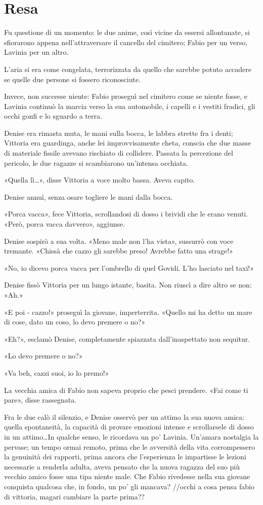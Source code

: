 \chapter{Resa}

Fu questione di un momento: le due anime, così vicine da essersi allontanate, si sfiorarono appena nell'attraversare il cancello del cimitero; Fabio per un verso, Lavinia per un altro. 

L'aria si era come congelata, terrorizzata da quello che sarebbe potuto accadere se quelle due persone si fossero riconosciute. 

Invece, non successe niente: Fabio proseguì nel cimitero come se niente fosse, e Lavinia continuò la marcia verso la sua automobile, i capelli e i vestiti fradici, gli occhi gonfi e lo sguardo a terra.

Denise era rimasta muta, le mani sulla bocca, le labbra strette fra i denti; Vittoria era guardinga, anche lei improvvisamente cheta, conscia che due masse di materiale fissile avevano rischiato di collidere. Passata la percezione del pericolo, le due ragazze si scambiarono un'intensa occhiata.

«Quella lì\ldots», disse Vittoria a voce molto bassa. Aveva capito.

Denise annuì, senza osare togliere le mani dalla bocca.

«Porca vacca», fece Vittoria, scrollandosi di dosso i brividi che le erano venuti. «Però, porca vacca davvero», aggiunse.

Denise sospirò a sua volta. «Meno male non l'ha vista», sussurrò con voce tremante. «Chissà che cazzo gli sarebbe preso! Avrebbe fatto una strage!»

«No, io dicevo porca vacca per l'ombrello di quel Govidi. L'ho lasciato nel taxi!»

Denise fissò Vittoria per un lungo istante, basita. Non riuscì a dire altro se non: «Ah.»

«E poi - cazzo!» proseguì la giovane, imperterrita. «Quello mi ha detto un mare di cose,  dato un coso, lo devo premere o no?»

«Eh?», esclamò Denise, completamente spiazzata dall'inaspettato non sequitur.

«Lo devo premere o no?»

«Va beh, cazzi suoi, io lo premo!»

La vecchia amica di Fabio non sapeva proprio che pesci prendere. «Fai come ti pare», disse rassegnata.

Fra le due calò il silenzio, e Denise osservò per un attimo la sua nuova amica: quella spontaneità, la capacità di provare emozioni intense e scrollarsele di dosso in un attimo\ldots In qualche senso, le ricordava un po' Lavinia. Un'amara nostalgia la pervase; un tempo ormai remoto, prima che le avversità della vita corrompessero la genuinità dei rapporti, prima ancora che l'esperienza le impartisse le lezioni necessarie a renderla adulta, aveva pensato che la nuova ragazza del suo più vecchio amico fosse una tipa niente male. Che Fabio rivedesse nella sua giovane conquista qualcosa che, in fondo, un po' gli mancava?
//occhi a cosa pensa fabio di vittoria, magari cambiare la parte prima??

